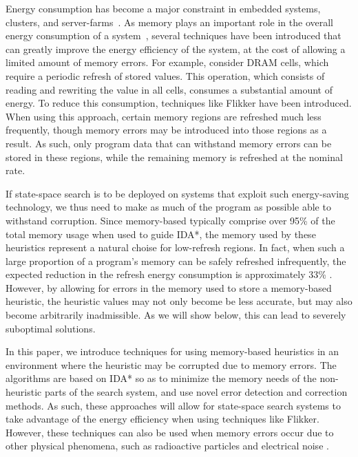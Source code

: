 \documentclass{article}
\begin{document}
Energy consumption has become a major constraint in embedded systems, clusters, and server-farms~\cite{Cameron2005}. As memory plays an important role in the overall energy consumption of a system~\cite{5695550}, several techniques have been introduced that can greatly improve the energy efficiency of the system, at the cost of allowing a limited amount of memory errors. For example, consider DRAM cells, which require a periodic refresh of stored values. This operation, which consists of reading and rewriting the value in all cells, consumes a substantial amount of energy. To reduce this consumption, techniques like Flikker \cite{Liu:2011:FSD:1950365.1950391} have been introduced. When using this approach, certain memory regions are refreshed much less frequently, though memory errors may be introduced into those regions as a result. As such, only program data that can withstand memory errors can be stored in these regions, while the remaining memory is refreshed at the nominal rate. 

If state-space search is to be deployed on systems that exploit such energy-saving technology, we thus need to make as much of the program as possible able to withstand corruption. Since memory-based typically comprise over 95\% of the total memory usage when used to guide IDA*, the memory used by these heuristics represent a natural choise for low-refresh regions. In fact, when such a large proportion of a program's memory can be safely refreshed infrequently, the expected reduction in the refresh energy consumption is approximately 33\% \cite{Liu:2011:FSD:1950365.1950391}. However, by allowing for errors in the memory used to store a memory-based heuristic, the heuristic values may not only become be less accurate, but may also become arbitrarily inadmissible. As we will show below, this can lead to severely suboptimal solutions.

In this paper, we introduce techniques for using memory-based heuristics in an environment where the heuristic may be corrupted due to memory errors. The algorithms are based on IDA* so as to minimize the memory needs of the non-heuristic parts of the search system, and use novel error detection and correction methods. As such, these approaches will allow for state-space search systems to take advantage of the energy efficiency when using techniques like Flikker. However, these techniques can also be used when memory errors occur due to other physical phenomena, such as radioactive particles and electrical noise \cite{7266869}.
\end{document}
